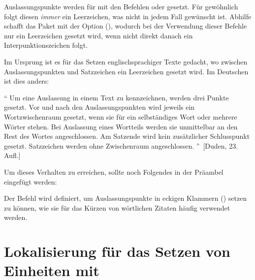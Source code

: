 %
Auslassungspunkte werden für  mit den Befehlen  oder 
 gesetzt. Für gewöhnlich folgt diesen \emph{immer} ein 
Leerzeichen, was nicht in jedem Fall gewünscht ist. Abhilfe schafft das Paket 
 mit der Option (), wodurch 
bei der Verwendung dieser Befehle nur ein Leerzeichen gesetzt wird, wenn nicht 
direkt danach ein Interpunktionszeichen folgt.
%
\begin{quoting}
\begin{Code}
\usepackage[xspace]{ellipsis}
\end{Code}
\end{quoting}
%
Im Ursprung ist es für das Setzen englischsprachiger Texte gedacht, wo zwischen 
Auslassungspunkten und Satzzeichen ein Leerzeichen gesetzt wird. Im Deutschen 
ist dies anders:
%
\begin{quoting}
\enquote{%
  Um eine Auslassung in einem Text zu kennzeichnen, werden drei Punkte gesetzt. 
  Vor und nach den Auslassungspunkten wird jeweils ein Wortzwischenraum 
  gesetzt, wenn sie für ein selbständiges Wort oder mehrere Wörter stehen. Bei 
  Auslassung eines Wortteils werden sie unmittelbar an den Rest des Wortes 
  angeschlossen. Am Satzende wird kein zusätzlicher Schlusspunkt gesetzt. 
  Satzzeichen werden ohne Zwischenraum angeschlossen.%
}~[Duden, 23. Aufl.]
\end{quoting} 
%
Um dieses Verhalten zu erreichen, sollte noch Folgendes in der Präambel 
eingefügt werden:
%
\begin{quoting}
\begin{Code}
\let\ellipsispunctuation\relax
\newcommand*{\qdots}{[\dots{}]\xspace}
\end{Code}
\end{quoting}
%
Der Befehl  wird definiert, um Auslassungspunkte in eckigen 
Klammern (\OPValue{\dots}) setzen zu können, wie sie für das Kürzen von 
wörtlichen Zitaten häufig verwendet werden.



\section{%
  Lokalisierung für das Setzen von Einheiten mit 
  \label{sec:tips:siunitx}%
}

